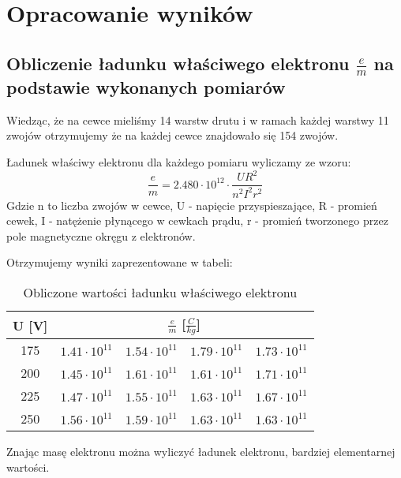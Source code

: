 \documentclass{article}
\begin{document}

\section{Opracowanie wyników}
\subsection{Obliczenie ładunku właściwego elektronu $\frac{e}{m}$ na podstawie wykonanych pomiarów}

Wiedząc, że na cewce mieliśmy 14 warstw drutu i w ramach każdej warstwy 11 zwojów otrzymujemy że na każdej cewce znajdowało się 154 zwojów.

Ładunek właściwy elektronu dla każdego pomiaru wyliczamy ze wzoru:
\begin{equation}
	\frac{e}{m} = 2.480 \cdot 10^{12} \cdot \frac{UR^2}{n^2I^2r^2}
\end{equation}
Gdzie n to liczba zwojów w cewce, U - napięcie przyspieszające, R - promień cewek, I - natężenie płynącego w cewkach prądu, r - promień tworzonego przez pole magnetyczne okręgu z elektronów.

\clearpage

Otrzymujemy wyniki zaprezentowane w tabeli:
\begin{table}[htbp]
\centering
\begin{tabular}{|c|r|r|r|r|}
\hline
U [V] & \multicolumn{4}{|c|}{$\frac{e}{m}$ [$\frac{C}{kg}$]} \\ \hline
175 & $1.41 \cdot 10^{11}$ & $1.54 \cdot 10^{11}$ & $1.79 \cdot 10^{11}$ & $1.73 \cdot 10^{11}$ \\ \hline
200 & $1.45 \cdot 10^{11}$ & $1.61 \cdot 10^{11}$ & $1.61 \cdot 10^{11}$ & $1.71 \cdot 10^{11}$ \\ \hline
225 & $1.47 \cdot 10^{11}$ & $1.55 \cdot 10^{11}$ & $1.63 \cdot 10^{11}$ & $1.67 \cdot 10^{11}$ \\ \hline
250 & $1.56 \cdot 10^{11}$ & $1.59 \cdot 10^{11}$ & $1.63 \cdot 10^{11}$ & $1.63 \cdot 10^{11}$ \\ \hline
\end{tabular}
\caption{Obliczone wartości ładunku właściwego elektronu}
\label{}
\end{table}

Znając masę elektronu można wyliczyć ładunek elektronu, bardziej elementarnej wartości.
\end{document}
